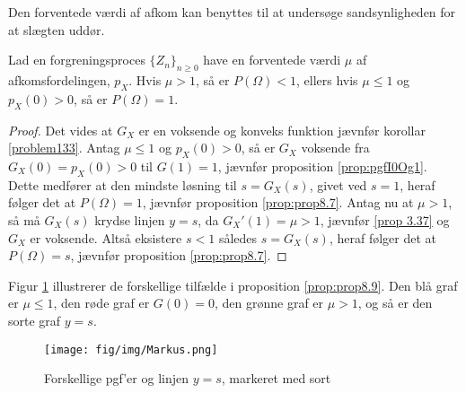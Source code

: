 Den forventede værdi af afkom kan benyttes til at undersøge sandsynligheden for at slægten uddør.
\begin{prop} \label{prop:prop8.9}%
  Lad en forgreningsproces $\{Z_{n}\}_{n \geq 0}$ have en forventede værdi $\mu$ af afkomsfordelingen, $p_{X}$. Hvis $\mu > 1$, så er $P(\Omega) < 1$, ellers hvis $\mu \leq 1$ og $p_{X}(0) > 0$, så er $P(\Omega) = 1$.
\end{prop}
\begin{proof}
  Det vides at $G_{X}$ er en voksende og konveks funktion jævnfør korollar \ref{problem133}.
  Antag $\mu \leq 1$ og $p_{X}(0) > 0$, så er $G_{X}$ voksende fra $G_{X}(0) = p_{X}(0) > 0$ til $G(1) = 1$, jævnfør proposition \ref{prop:pgfI0Og1}. Dette medfører at den mindste løsning til $s = G_{X}(s)$, givet ved $s = 1$, heraf følger det at $P(\Omega) = 1$, jævnfør proposition \ref{prop:prop8.7}.
  Antag nu at $\mu > 1$, så må $G_{X}(s)$ krydse linjen $y = s$, da $G_{X}'(1) = \mu > 1$, jævnfør \ref{prop 3.37} og $G_{X}$ er voksende. Altså eksistere $s < 1$ således $s = G_{X}(s)$, heraf følger det at $P(\Omega) = s$, jævnfør proposition \ref{prop:prop8.7}.
\end{proof}

Figur \ref{fig:proofprop8.9} illustrerer de forskellige tilfælde i proposition \ref{prop:prop8.9}. Den blå graf er $\mu\leq1$, den røde graf er $G(0)=0$, den grønne graf er $\mu>1$, og så er den sorte graf $y=s$. 
\begin{figure}[H]
    \centering
   \texttt{[image: fig/img/Markus.png]}
    \caption{Forskellige pgf'er og linjen $y = s$, markeret med sort}
    \label{fig:proofprop8.9}
\end{figure}

